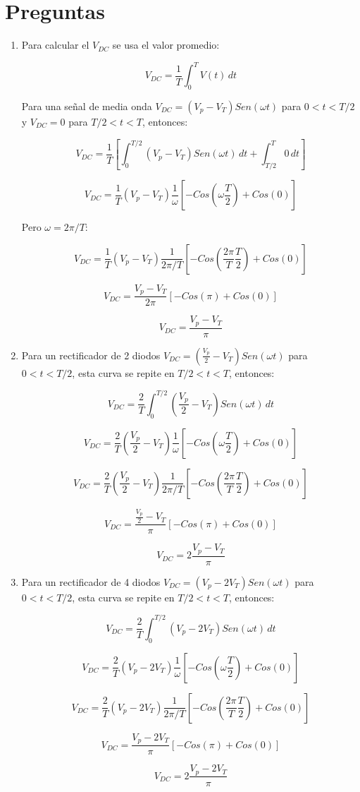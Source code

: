 \section{Preguntas}

\begin{enumerate}
	\item Para calcular el $V_{DC}$ se usa el valor promedio:
	
	\[
	V_{DC} = \frac{1}{T} \int_{0}^{T} V(t)\,dt
	\]
	
	Para una señal de media onda $V_{DC} = (V_p-V_T) Sen(\omega t)$ para $0<t<T/2$ y $V_{DC} = 0$ para $T/2<t<T$, entonces:
	
	\[
	V_{DC} = \frac{1}{T} [\int_{0}^{T/2} (V_p-V_T) Sen(\omega t)\,dt + \int_{T/2}^{T} 0\,dt]
	\]
	
	\[
	V_{DC} = \frac{1}{T} (V_p-V_T) \frac{1}{\omega} [-Cos(\omega \frac{T}{2}) + Cos(0)]
	\]
	
	Pero $\omega = 2\pi / T$:
	
	\[
	V_{DC} = \frac{1}{T} (V_p-V_T) \frac{1}{2\pi / T} [-Cos(\frac{2\pi}{T} \frac{T}{2}) + Cos(0)]
	\]
	
	\[
	V_{DC} = \frac{V_p-V_T}{2\pi} [-Cos(\pi) + Cos(0)]
	\]
	
	\[
	V_{DC} = \frac{V_p-V_T}{\pi}
	\]
	
	\item Para un rectificador de 2 diodos $V_{DC} = (\frac{V_p}{2}-V_T) Sen(\omega t)$ para $0<t<T/2$, esta curva se repite en $T/2<t<T$, entonces:
	
	\[
	V_{DC} = \frac{2}{T} \int_{0}^{T/2} (\frac{V_p}{2}-V_T) Sen(\omega t)\,dt
	\]
	
	\[
	V_{DC} = \frac{2}{T} (\frac{V_p}{2}-V_T) \frac{1}{\omega} [-Cos(\omega \frac{T}{2}) + Cos(0)]
	\]
	
	\[
	V_{DC} = \frac{2}{T} (\frac{V_p}{2}-V_T) \frac{1}{2\pi / T} [-Cos(\frac{2\pi}{T} \frac{T}{2}) + Cos(0)]
	\]
	
	\[
	V_{DC} = \frac{\frac{V_p}{2}-V_T}{\pi} [-Cos(\pi) + Cos(0)]
	\]
	
	\[
	V_{DC} = 2\frac{V_p-V_T}{\pi}
	\]
	
	\item Para un rectificador de 4 diodos $V_{DC} = (V_p-2V_T) Sen(\omega t)$ para $0<t<T/2$, esta curva se repite en $T/2<t<T$, entonces:
	
	\[
	V_{DC} = \frac{2}{T} \int_{0}^{T/2} (V_p-2V_T) Sen(\omega t)\,dt
	\]
	
	\[
	V_{DC} = \frac{2}{T} (V_p-2V_T) \frac{1}{\omega} [-Cos(\omega \frac{T}{2}) + Cos(0)]
	\]
	
	\[
	V_{DC} = \frac{2}{T} (V_p-2V_T) \frac{1}{2\pi / T} [-Cos(\frac{2\pi}{T} \frac{T}{2}) + Cos(0)]
	\]
	
	\[
	V_{DC} = \frac{V_p-2V_T}{\pi} [-Cos(\pi) + Cos(0)]
	\]
	
	\[
	V_{DC} = 2\frac{V_p-2V_T}{\pi}
	\]
\end{enumerate}